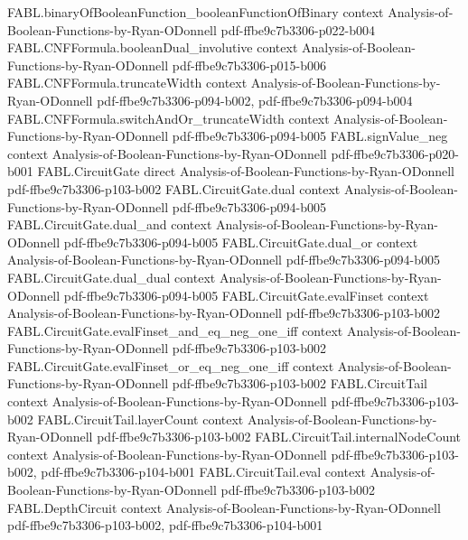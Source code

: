\begin{theorem}
\proofstep
  {FABL.binaryOfBooleanFunction_booleanFunctionOfBinary}
  {context}
  {Analysis-of-Boolean-Functions-by-Ryan-ODonnell}
  {pdf-ffbe9c7b3306-p022-b004}
\proofstep
  {FABL.CNFFormula.booleanDual_involutive}
  {context}
  {Analysis-of-Boolean-Functions-by-Ryan-ODonnell}
  {pdf-ffbe9c7b3306-p015-b006}
\proofstep
  {FABL.CNFFormula.truncateWidth}
  {context}
  {Analysis-of-Boolean-Functions-by-Ryan-ODonnell}
  {pdf-ffbe9c7b3306-p094-b002,
    pdf-ffbe9c7b3306-p094-b004}
\proofstep
  {FABL.CNFFormula.switchAndOr_truncateWidth}
  {context}
  {Analysis-of-Boolean-Functions-by-Ryan-ODonnell}
  {pdf-ffbe9c7b3306-p094-b005}
\proofstep
  {FABL.signValue_neg}
  {context}
  {Analysis-of-Boolean-Functions-by-Ryan-ODonnell}
  {pdf-ffbe9c7b3306-p020-b001}
\proofstep
  {FABL.CircuitGate}
  {direct}
  {Analysis-of-Boolean-Functions-by-Ryan-ODonnell}
  {pdf-ffbe9c7b3306-p103-b002}
\proofstep
  {FABL.CircuitGate.dual}
  {context}
  {Analysis-of-Boolean-Functions-by-Ryan-ODonnell}
  {pdf-ffbe9c7b3306-p094-b005}
\proofstep
  {FABL.CircuitGate.dual_and}
  {context}
  {Analysis-of-Boolean-Functions-by-Ryan-ODonnell}
  {pdf-ffbe9c7b3306-p094-b005}
\proofstep
  {FABL.CircuitGate.dual_or}
  {context}
  {Analysis-of-Boolean-Functions-by-Ryan-ODonnell}
  {pdf-ffbe9c7b3306-p094-b005}
\proofstep
  {FABL.CircuitGate.dual_dual}
  {context}
  {Analysis-of-Boolean-Functions-by-Ryan-ODonnell}
  {pdf-ffbe9c7b3306-p094-b005}
\proofstep
  {FABL.CircuitGate.evalFinset}
  {context}
  {Analysis-of-Boolean-Functions-by-Ryan-ODonnell}
  {pdf-ffbe9c7b3306-p103-b002}
\proofstep
  {FABL.CircuitGate.evalFinset_and_eq_neg_one_iff}
  {context}
  {Analysis-of-Boolean-Functions-by-Ryan-ODonnell}
  {pdf-ffbe9c7b3306-p103-b002}
\proofstep
  {FABL.CircuitGate.evalFinset_or_eq_neg_one_iff}
  {context}
  {Analysis-of-Boolean-Functions-by-Ryan-ODonnell}
  {pdf-ffbe9c7b3306-p103-b002}
\proofstep
  {FABL.CircuitTail}
  {context}
  {Analysis-of-Boolean-Functions-by-Ryan-ODonnell}
  {pdf-ffbe9c7b3306-p103-b002}
\proofstep
  {FABL.CircuitTail.layerCount}
  {context}
  {Analysis-of-Boolean-Functions-by-Ryan-ODonnell}
  {pdf-ffbe9c7b3306-p103-b002}
\proofstep
  {FABL.CircuitTail.internalNodeCount}
  {context}
  {Analysis-of-Boolean-Functions-by-Ryan-ODonnell}
  {pdf-ffbe9c7b3306-p103-b002,
    pdf-ffbe9c7b3306-p104-b001}
\proofstep
  {FABL.CircuitTail.eval}
  {context}
  {Analysis-of-Boolean-Functions-by-Ryan-ODonnell}
  {pdf-ffbe9c7b3306-p103-b002}
\proofstep
  {FABL.DepthCircuit}
  {context}
  {Analysis-of-Boolean-Functions-by-Ryan-ODonnell}
  {pdf-ffbe9c7b3306-p103-b002,
    pdf-ffbe9c7b3306-p104-b001}
\proofstep

\end{theorem}
